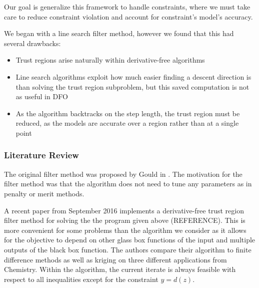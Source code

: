 \documentclass{article}
\begin{document}
Our goal is generalize this framework to handle constraints, where we must take care to reduce constraint violation and account for constraint's model's accuracy.



\underline{\hspace{8cm}}

\underline{\hspace{8cm}}

We began with a line search filter method, however we found that this had several drawbacks:

\begin{itemize}
\item Trust regions arise naturally within derivative-free algorithms
\item Line search algorithms exploit how much easier finding a descent direction is than solving the trust region subproblem, but this saved computation is not as useful in DFO
\item As the algorithm backtracks on the step length, the trust region must be reduced, as the models are accurate over a region rather than at a single point
\end{itemize}


\underline{\hspace{8cm}}

\underline{\hspace{8cm}}


\subsubsection{Literature Review}

The original filter method was proposed by Gould in \cite{DUMMY:original_filter}. The motivation for the filter method was that the algorithm does not need to tune any parameters as in penalty or merit methods.

A recent paper from September 2016 \cite{DUMMY:Biegler} implements a derivative-free trust region filter method for solving the the program given above (REFERENCE).
This is more convenient for some problems than the algorithm we consider as it allows for the objective to depend on other glass box functions of the input and multiple outputs of the black box function.
The authors compare their algorithm to finite difference methods as well as kriging on three different applications from Chemistry. Within the algorithm, the current iterate is always feasible with respect to all inequalities except for the constraint $y=d(z)$.
\end{document}
